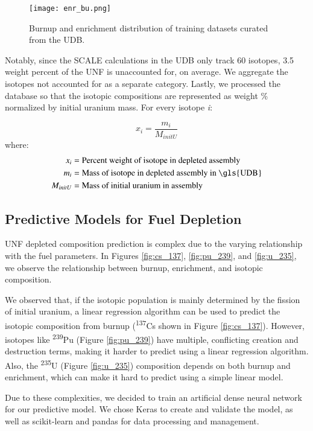 \begin{figure}
    \centering
    \texttt{[image: enr\_bu.png]}
    \caption{Burnup and enrichment distribution of training
             datasets curated from the \gls{UDB}.}
    \label{fig:enr_bu}
\end{figure}


Notably, since the SCALE calculations in the \gls{UDB} only track 60 isotopes,
3.5 weight percent of the \gls{UNF} is unaccounted for, on average. We
aggregate the isotopes not accounted for as a separate category. Lastly,
we processed the database so that the isotopic compositions are 
represented as weight \% normalized by initial uranium mass.
For every isotope \textit{i}:

\begin{equation}
x_i = \frac{m_i}{M_{initU}}
\end{equation}
where:
\begin{align*}
x_i &= \text{Percent weight of isotope in depleted assembly}\\
m_i &= \text{Mass of isotope in depleted assembly in \gls{UDB}}\\
M_{initU} &= \text{Mass of initial uranium in assembly}
\end{align*}


\subsection{Predictive Models for Fuel Depletion}

\gls{UNF} depleted composition prediction is complex
due to the varying relationship with the fuel parameters.
In Figures \ref{fig:cs_137}, \ref{fig:pu_239}, and \ref{fig:u_235},
we observe the relationship between
burnup, enrichment, and isotopic composition.

We observed that, if the isotopic population is mainly determined by
the fission of initial uranium, a linear regression algorithm
can be used to predict the isotopic composition from burnup
(\textsuperscript{137}Cs shown in Figure \ref{fig:cs_137}).
However, isotopes like \textsuperscript{239}Pu (Figure \ref{fig:pu_239}) have multiple, conflicting creation
and destruction terms, making it harder to predict using a
linear regression algorithm. Also, the \textsuperscript{235}U (Figure \ref{fig:u_235})
composition
depends on both burnup and enrichment, which can make it
hard to predict using a simple linear model.

Due to these complexities, we decided to train an artificial
dense neural network for our predictive model. We chose
Keras \cite{collet_keras_2015} to create and validate the model,
as well as scikit-learn \cite{pedregosa_scikit-learn_2011}
and pandas \cite{mckinney-proc-scipy-2010} for data processing and management.

